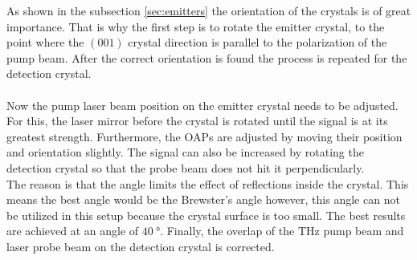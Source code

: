 As shown in the subsection \ref{sec:emitters} the orientation of the crystals is of great importance.
That is why the first step is to rotate the emitter crystal, to the point where the $(001)$ crystal direction is parallel to the polarization of the pump beam.
After the correct orientation is found the process is repeated for the detection crystal.
\\\\
Now the pump laser beam position on the emitter crystal needs to be adjusted.
For this, the laser mirror before the crystal is rotated until the signal is at its greatest strength.
Furthermore, the OAPs are adjusted by moving their position and orientation slightly.
The signal can also be increased by rotating the detection crystal so that the probe beam does not hit it perpendicularly.
\\
The reason is that the angle limits the effect of reflections inside the crystal.
This means the best angle would be the Brewster's angle however, this angle can not be utilized in this setup because the crystal surface is too small. 
The best results are achieved at an angle of $\SI{40}{\degree}$.
Finally, the overlap of the $\si{\tera\hertz}$ pump beam and laser probe beam on the detection crystal is corrected.

\FloatBarrier
